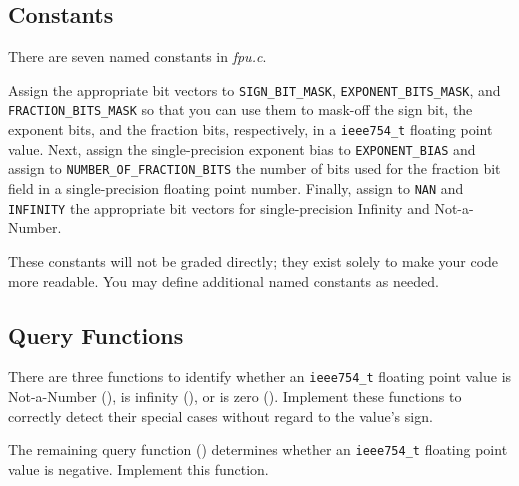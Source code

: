 \subsection{Constants}

There are seven named constants in \textit{fpu.c}.

Assign the appropriate bit vectors to \lstinline{SIGN_BIT_MASK}, \lstinline{EXPONENT_BITS_MASK}, and \lstinline{FRACTION_BITS_MASK} so that you can use them to mask-off the sign bit, the exponent bits, and the fraction bits, respectively, in a \lstinline{ieee754_t} floating point value.
Next, assign the single-precision exponent bias to \lstinline{EXPONENT_BIAS} and assign to \lstinline{NUMBER_OF_FRACTION_BITS} the number of bits used for the fraction bit field in a single-precision floating point number.
Finally, assign to \lstinline{NAN} and \lstinline{INFINITY} the appropriate bit vectors for single-precision Infinity and Not-a-Number.

These constants will not be graded directly;
they exist solely to make your code more readable.
You may define additional named constants as needed.

\subsection{Query Functions}

There are three functions to identify whether an \lstinline{ieee754_t} floating point value is Not-a-Number (), is infinity (), or is zero ().
Implement these functions to correctly detect their special cases without regard to the value's sign.

The remaining query function () determines whether an \lstinline{ieee754_t} floating point value is negative.
Implement this function.